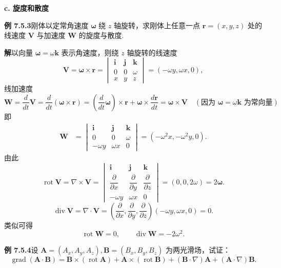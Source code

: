 \documentclass[UTF8, 12pt, fontset=fandol, oneside]{ctexart}
\begin{document}
\noindent\textbf{c. 旋度和散度}

\noindent\textbf{例 7.5.3}\quad 刚体以定常角速度 $\boldsymbol\omega$ 绕 $z$ 轴旋转，求刚体上任意一点 $\mathbf r=(x,y,z)$ 处的线速度 $\mathbf V$ 与加速度 $\mathbf W$ 的旋度与散度.

\noindent\textbf{解}\quad 以向量 $\boldsymbol\omega=\omega\mathbf k$ 表示角速度，则绕 $z$ 轴旋转的线速度
\[
\mathbf V=\boldsymbol\omega\times\mathbf r
=
\begin{vmatrix}
\mathbf i & \mathbf j & \mathbf k\\
0 & 0 & \omega\\
x & y & z
\end{vmatrix}
=(-\omega y,\omega x,0),
\]
线加速度
\[
\mathbf W=\frac d{dt}\mathbf V
=\frac d{dt}(\boldsymbol\omega\times\mathbf r)
=\left(\frac d{dt}\boldsymbol\omega\right)\times\mathbf r+\boldsymbol\omega\times\frac{d\mathbf r}{dt}
=\boldsymbol\omega\times\mathbf V
\quad(\text{因为 }\boldsymbol\omega=\omega\mathbf k\text{ 为常向量})
\]
即
\[
\begin{aligned}
\mathbf W
&=
\begin{vmatrix}
\mathbf i & \mathbf j & \mathbf k\\
0 & 0 & \omega\\
-\omega y & \omega x & 0
\end{vmatrix}
=(-\omega^2x,-\omega^2y,0).
\end{aligned}
\]
由此
\[
\operatorname{rot}\mathbf V=\nabla\times\mathbf V
=
\begin{vmatrix}
\mathbf i & \mathbf j & \mathbf k\\
\dfrac{\partial}{\partial x} & \dfrac{\partial}{\partial y} & \dfrac{\partial}{\partial z}\\
-\omega y & \omega x & 0
\end{vmatrix}
=(0,0,2\omega)=2\boldsymbol\omega.
\]
\[
\operatorname{div}\mathbf V=\nabla\cdot\mathbf V
=\left(\frac{\partial}{\partial x},\frac{\partial}{\partial y},\frac{\partial}{\partial z}\right)(-\omega y,\omega x,0)=0.
\]
类似可得
\[
\operatorname{rot}\mathbf W=0,\qquad \operatorname{div}\mathbf W=-2\omega^2.
\]

\noindent\textbf{例 7.5.4}\quad 设 $\mathbf A=(A_x,A_y,A_z),\mathbf B=(B_x,B_y,B_z)$ 为两光滑场，试证：
\[
\operatorname{grad}(\mathbf A\cdot\mathbf B)
=\mathbf B\times(\operatorname{rot}\mathbf A)+\mathbf A\times(\operatorname{rot}\mathbf B)+(\mathbf B\cdot\nabla)\mathbf A+(\mathbf A\cdot\nabla)\mathbf B. \tag{1}
\]
\end{document}
